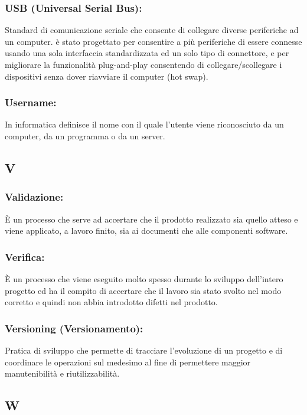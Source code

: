 \subsubsection*{USB (Universal Serial Bus):} Standard di comunicazione seriale
che consente di collegare diverse periferiche ad un computer. \`e stato progettato
per consentire a pi\`u periferiche di essere connesse usando una sola interfaccia
standardizzata ed un solo tipo di connettore, e per migliorare la funzionalit\`a
plug-and-play consentendo di collegare/scollegare i dispositivi senza dover
riavviare il computer (hot swap).

\subsubsection*{Username:} In informatica definisce il nome con il quale
l'utente viene riconosciuto da un computer, da un programma o da un server.

\subsection*{\huge{V}} 
\subsubsection*{Validazione:}
\`E un processo che serve ad accertare che il prodotto realizzato sia quello
atteso e viene applicato, a lavoro finito, sia ai documenti che alle componenti
software.

\subsubsection*{Verifica:}
\`E un processo che viene eseguito molto spesso durante lo sviluppo dell'intero
progetto ed ha il compito di accertare che il lavoro sia stato svolto nel modo
corretto e quindi non abbia introdotto difetti nel prodotto.

\subsubsection*{Versioning (Versionamento):} Pratica di sviluppo che permette di
tracciare l'evoluzione di un progetto e di coordinare le operazioni sul medesimo
al fine di permettere maggior manutenibilit\`a e riutilizzabilit\`a.

\subsection*{\huge{W}}
